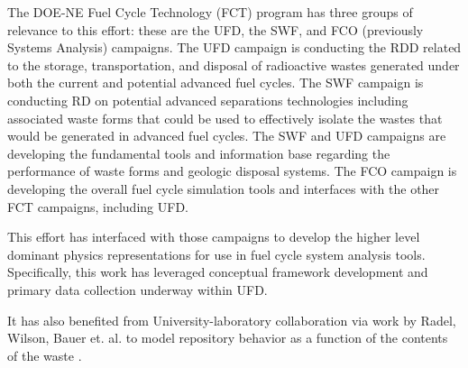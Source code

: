 
The DOE-NE Fuel Cycle Technology (FCT) program has three groups of relevance to
this effort: these are the \gls{UFD}, the \gls{SWF}, and \gls{FCO} (previously
Systems Analysis) campaigns.  The \gls{UFD} campaign is conducting the
\gls{RDD} related to the storage, transportation, and disposal of radioactive
wastes generated under both the current and potential advanced fuel cycles.
The \gls{SWF} campaign is conducting \gls{RD} on potential advanced separations
technologies including associated waste forms that could be used to effectively
isolate the wastes that would be generated in advanced fuel cycles.  The
\gls{SWF} and \gls{UFD} campaigns are developing the fundamental tools and
information base regarding the performance of waste forms and geologic disposal
systems.  The \gls{FCO} campaign is developing the overall fuel cycle
simulation tools and interfaces with the other FCT campaigns, including
\gls{UFD}.  

This effort has interfaced with those campaigns to develop the higher level
dominant physics representations for use in fuel cycle system analysis tools.
Specifically, this work has leveraged conceptual framework development and
primary data collection underway within \gls{UFD}.

It has also benefited from University-laboratory collaboration via work by 
Radel, Wilson, Bauer et. al. to model repository behavior as a function of the 
contents of the waste \cite{radel_effect_2007}.  
